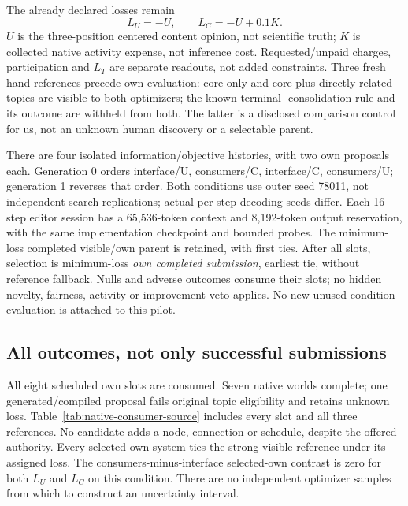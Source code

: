 The already declared losses remain
\[
 L_U=-U,\qquad L_C=-U+0.1K.
\]
$U$ is the three-position centered content opinion, not scientific truth;
$K$ is collected native activity expense, not inference cost. Requested/unpaid
charges, participation and $L_T$ are separate readouts, not added constraints.
Three fresh hand references precede own evaluation: core-only and core plus
directly related topics are visible to both optimizers; the known terminal-
consolidation rule and its outcome are withheld from both. The latter is a
disclosed comparison control for us, not an unknown human discovery or a
selectable parent.

There are four isolated information/objective histories, with two own proposals
each. Generation 0 orders interface/U, consumers/C, interface/C, consumers/U;
generation 1 reverses that order. Both conditions use outer seed 78011,
not independent search replications; actual per-step decoding seeds differ.
Each 16-step editor session has a 65,536-token context and 8,192-token output
reservation, with the same implementation checkpoint and bounded probes.
The minimum-loss completed visible/own parent is retained, with first ties.
After all slots, selection is minimum-loss \emph{own completed submission},
earliest tie, without reference fallback. Nulls and adverse outcomes consume
their slots; no hidden novelty, fairness, activity or improvement veto applies.
No new unused-condition evaluation is attached to this pilot.

\subsection{All outcomes, not only successful submissions}
All eight scheduled own slots are consumed. Seven native worlds complete;
one generated/compiled proposal fails original topic eligibility and retains
unknown loss. Table~\ref{tab:native-consumer-source} includes every slot and
all three references. No candidate adds a node, connection or schedule, despite
the offered authority. Every selected own system ties the strong visible
reference under its assigned loss. The consumers-minus-interface selected-own
contrast is zero for both $L_U$ and $L_C$ on this condition. There are no
independent optimizer samples from which to construct an uncertainty interval.

